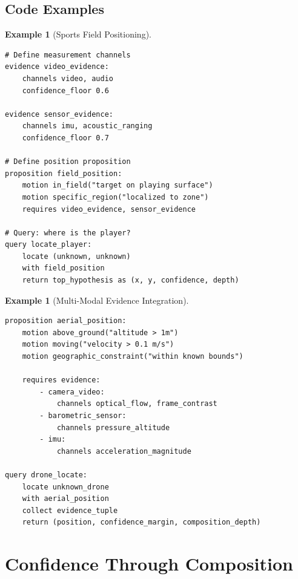 \documentclass[twocolumn,10pt]{article}
\newtheorem{example}[theorem]{Example}
\begin{document}
\subsection{Code Examples}

\begin{example}[Sports Field Positioning]
\label{ex:sports}
\begin{lstlisting}[caption={Locating a player on a soccer field.}, label=lst:sports]
# Define measurement channels
evidence video_evidence:
    channels video, audio
    confidence_floor 0.6

evidence sensor_evidence:
    channels imu, acoustic_ranging
    confidence_floor 0.7

# Define position proposition
proposition field_position:
    motion in_field("target on playing surface")
    motion specific_region("localized to zone")
    requires video_evidence, sensor_evidence

# Query: where is the player?
query locate_player:
    locate (unknown, unknown)
    with field_position
    return top_hypothesis as (x, y, confidence, depth)
\end{lstlisting}
\end{example}

\begin{example}[Multi-Modal Evidence Integration]
\label{ex:multimodal}
\begin{lstlisting}[caption={Drone positioning using vision and barometric data.}, label=lst:drone]
proposition aerial_position:
    motion above_ground("altitude > 1m")
    motion moving("velocity > 0.1 m/s")
    motion geographic_constraint("within known bounds")

    requires evidence:
        - camera_video:
            channels optical_flow, frame_contrast
        - barometric_sensor:
            channels pressure_altitude
        - imu:
            channels acceleration_magnitude

query drone_locate:
    locate unknown_drone
    with aerial_position
    collect evidence_tuple
    return (position, confidence_margin, composition_depth)
\end{lstlisting}
\end{example}

\section{Confidence Through Composition}
\label{sec:confidence}
\end{document}
